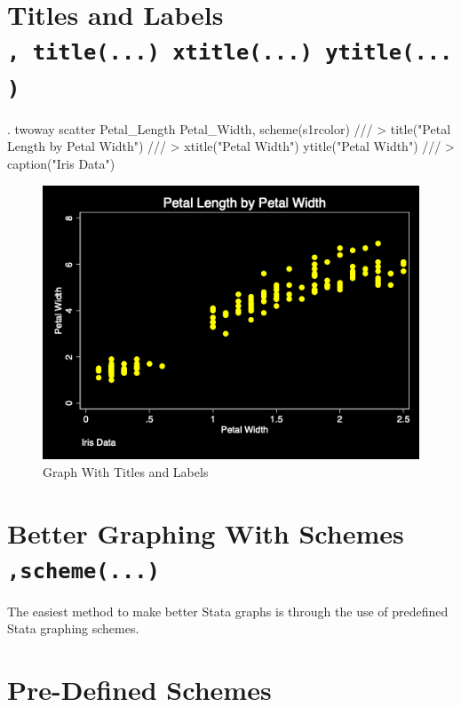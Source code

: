 \documentclass[
]{article}
\begin{document}
\hypertarget{titles-and-labels-title...-xtitle...-ytitle...}{%
\section{\texorpdfstring{Titles and Labels
\texttt{,\ title(...)\ xtitle(...)\ ytitle(...)}}{Titles and Labels , title(...) xtitle(...) ytitle(...)}}\label{titles-and-labels-title...-xtitle...-ytitle...}}

\begin{stlog}
. twoway scatter Petal_Length Petal_Width, scheme(s1rcolor) ///
> title("Petal Length by Petal Width") ///
> xtitle("Petal Width") ytitle("Petal Width") ///
> caption("Iris Data") 
\end{stlog}



\begin{figure}
\centering
\includegraphics[width=0.75\linewidth]{graphtitleslabels.png}
\caption{Graph With Titles and Labels}
\end{figure}

\hypertarget{better-graphing-with-schemes-scheme...}{%
\section{\texorpdfstring{Better Graphing With Schemes
\texttt{,scheme(...)}}{Better Graphing With Schemes ,scheme(...)}}\label{better-graphing-with-schemes-scheme...}}

The easiest method to make better Stata graphs is through the use of
predefined Stata graphing schemes.

\hypertarget{pre-defined-schemes}{%
\section{Pre-Defined Schemes}\label{pre-defined-schemes}}
\end{document}
